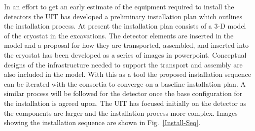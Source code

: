 In an effort to get an early estimate of the equipment required to install the detectors the UIT has developed a preliminary installation plan which outlines the installation process. At present the installation plan consists of a 3-D model of the cryostat in the excavations. The   detector elements are inserted in the model and a proposal for how they are transported, assembled, and inserted into the cryostat has been developed as a series of images in powerpoint. Conceptual designs of the infrastructure needed to support the transport and assembly are also included in the model. With this as a tool the proposed installation sequence can be iterated with the consortia to converge on a baseline installation plan. A similar process will be followed for the   detector once the base configuration for the   installation is agreed upon. The UIT has focused initially on the   detector as the   components are larger and the installation process more complex. Images showing the   installation sequence are shown in Fig.~\ref{Install-Seq}. 
